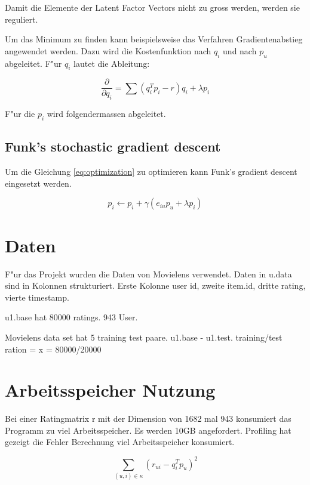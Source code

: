 \documentclass[a4paper, 11pt]{article}
\begin{document}
Damit die Elemente der Latent Factor Vectors nicht zu gross werden, werden sie reguliert.
 
Um das Minimum zu finden kann beispielsweise das Verfahren Gradientenabstieg angewendet werden. Dazu wird die Kostenfunktion nach $q_i$ und nach $p_u$ abgeleitet. F"ur $q_i$ lautet die Ableitung:

\begin{equation}
  \label{eq:decx}
  \frac{ \partial }{ \partial q_i } = \sum (q_i^T p_i - r) q_i + \lambda p_i
\end{equation}

F"ur die $p_i$ wird folgendermassen abgeleitet.

\subsection{Funk's stochastic gradient descent}
\label{sec:funksvd}

Um die Gleichung \ref{eq:optimization} zu optimieren kann Funk's gradient descent eingesetzt werden.

\begin{equation}
  \label{eq:funksvd}
  p_i \leftarrow p_i + \gamma (e_{iu} p_u + \lambda p_i)
\end{equation}

\section{Daten}
\label{sec:data}

F"ur das Projekt wurden die Daten von Movielens verwendet. Daten in u.data sind in Kolonnen strukturiert. Erste Kolonne user id, zweite item.id, dritte rating, vierte timestamp. 

u1.base hat 80000 ratings. 943 User.

Movielens data set hat 5 training test paare. u1.base - u1.test. 
training/test ration = x = 80000/20000

\section{Arbeitsspeicher Nutzung}
\label{sec:ram}

Bei einer Ratingmatrix r mit der Dimension von 1682 mal 943 konsumiert das Programm zu viel Arbeitsspeicher. Es werden 10GB angefordert. Profiling hat gezeigt die Fehler Berechnung viel Arbeitsspeicher konsumiert.

\begin{equation}
  \label{eq:squareerror}
  \sum_{(u,i) \in \kappa} (r_{ui} - q_i^T p_u)^2
\end{equation}
\end{document}
